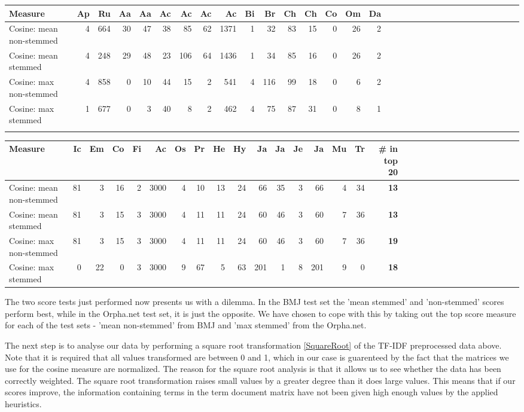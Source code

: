 \begin{table}[H]
\begin{tiny}
  \begin{tabular}{|l|r|r|r|r|r|r|r|r|r|r|r|r|r|r|r|r|r|r|r|r|r|r|r|r|r|r|r|r|r|r|r|}
    \hline
    Measure &Ap&Ru&Aa&Aa&Ac&Ac&Ac&Ac&Bi&Br&Ch&Ch&Co&Om&Da\\
    \hline
    Cosine: mean non-stemmed &4&664&30&47&38&85&62&1371&1&32&83&15&0&26&2\\
    \hline
    Cosine: mean stemmed &4&248&29&48&23&106&64&1436&1&34&85&16&0&26&2\\
    \hline
    Cosine: max non-stemmed &4&858&0&10&44&15&2&541&4&116&99&18&0&6&2\\
    \hline
    Cosine: max stemmed &1&677&0&3&40&8&2&462&4&75&87&31&0&8&1 \\
    \hline
    \multicolumn{16}{c}{} \\
    \end{tabular}
    \begin{tabular}{|l|r|r|r|r|r|r|r|r|r|r|r|r|r|r|r|r|r|r|r|r|r|r|r|r|r|r|r|r|r|r|}
    \hline
     Measure &Ic&Em&Co&Fi&Ac&Os&Pr&He&Hy&Ja&Ja&Je&Ja&Mu&Tr &\scriptsize{\textbf{\# in top 20}} \\
    \hline
    Cosine: mean non-stemmed  &81&3&16&2&3000&4&10&13&24&66&35&3&66&4&34 & \scriptsize{\textbf{13}} \\
    \hline
    Cosine: mean stemmed &81&3&15&3&3000&4&11&11&24&60&46&3&60&7&36 & \scriptsize{\textbf{13}} \\
    \hline
    Cosine: max non-stemmed &81&3&15&3&3000&4&11&11&24&60&46&3&60&7&36 & \scriptsize{\textbf{19}} \\
    \hline
    Cosine: max stemmed &0&22&0&3&3000&9&67&5&63&201&1&8&201&9&0 & \scriptsize{\textbf{18}} \\
    \hline
  \end{tabular}
\end{tiny}
\end{table}

The two score tests just performed now presents us with a dilemma. In the BMJ test set 
the 'mean stemmed' and 'non-stemmed' scores perform best, while in the Orpha.net test set, 
it is just the opposite. We have chosen to cope with this by taking out the top score 
measure for each of the test sets - 'mean non-stemmed' from BMJ and 'max stemmed' from 
the Orpha.net.

The next step is to analyse our data by performing a square root transformation 
\ref{SquareRoot} of the TF-IDF preprocessed data above. Note that it is required that 
all values transformed are between 0 and 1, which in our case is guarenteed by the fact 
that the matrices we use for the cosine measure are normalized. The reason for the 
square root analysis is that it allows us to see whether the data has been correctly 
weighted. The square root transformation raises small values by a greater degree than 
it does large values. This means that if our scores improve, the information containing 
terms in the term document matrix have not been given high enough values by the applied 
heuristics.

